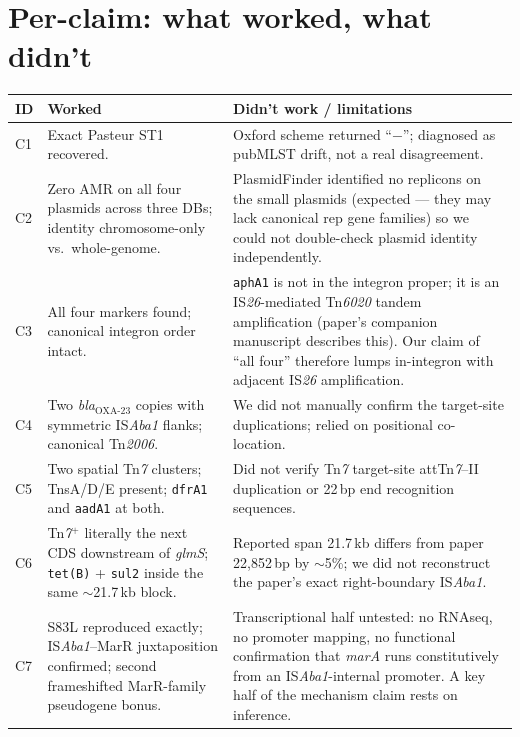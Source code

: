 \documentclass[11pt]{article}
\begin{document}
\section{Per-claim: what worked, what didn't}

\begin{longtable}{@{}p{0.5cm}p{5cm}p{9cm}@{}}
\toprule
ID & Worked & Didn't work / limitations \\ \midrule
C1 & Exact Pasteur ST1 recovered. & Oxford scheme returned ``$-$'';
      diagnosed as pubMLST drift, not a real disagreement. \\
C2 & Zero AMR on all four plasmids across three DBs; identity chromosome-only vs.\ whole-genome. &
     PlasmidFinder identified no replicons on the small plasmids (expected --- they may lack
     canonical rep gene families) so we could not double-check plasmid identity independently. \\
C3 & All four markers found; canonical integron order intact. &
     \texttt{aphA1} is not in the integron proper; it is an IS\emph{26}-mediated Tn\emph{6020}
     tandem amplification (paper's companion manuscript describes this).  Our claim of ``all four''
     therefore lumps in-integron with adjacent IS\emph{26} amplification. \\
C4 & Two \emph{bla}$_{\text{OXA-23}}$ copies with symmetric IS\emph{Aba1} flanks; canonical
     Tn\emph{2006}. & We did not manually confirm the target-site duplications; relied on
     positional co-location. \\
C5 & Two spatial Tn\emph{7} clusters; TnsA/D/E present; \texttt{dfrA1} and \texttt{aadA1} at both. &
     Did not verify Tn\emph{7} target-site attTn\emph{7}--II duplication or 22\,bp end
     recognition sequences. \\
C6 & Tn\emph{7}$^{+}$ literally the next CDS downstream of \emph{glmS}; \texttt{tet(B)} + \texttt{sul2}
     inside the same $\sim$21.7\,kb block. & Reported span 21.7\,kb differs from paper 22{,}852\,bp
     by $\sim$5\%; we did not reconstruct the paper's exact right-boundary IS\emph{Aba1}. \\
C7 & S83L reproduced exactly; IS\emph{Aba1}--MarR juxtaposition confirmed; second frameshifted
     MarR-family pseudogene bonus. & Transcriptional half untested: no RNAseq, no promoter
     mapping, no functional confirmation that \emph{marA} runs constitutively from an
     IS\emph{Aba1}-internal promoter.  A key half of the mechanism claim rests on inference. \\
\bottomrule
\end{longtable}
\end{document}
